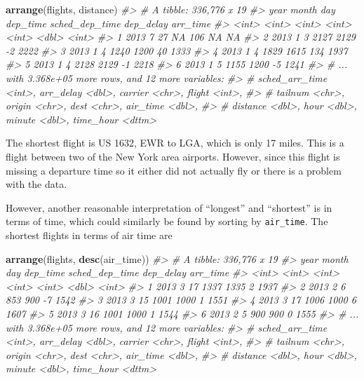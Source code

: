 \documentclass[]{book}
\newenvironment{Shaded}{\begin{snugshade}}{\end{snugshade}}
\newcommand{\CommentTok}[1]{\textcolor[rgb]{0.56,0.35,0.01}{\textit{#1}}}
\newcommand{\KeywordTok}[1]{\textcolor[rgb]{0.13,0.29,0.53}{\textbf{#1}}}
\newcommand{\NormalTok}[1]{#1}
\theoremstyle{plain}
\theoremstyle{remark}
\begin{document}
\begin{Shaded}
\begin{Highlighting}[]
\KeywordTok{arrange}\NormalTok{(flights, distance)}
\CommentTok{#> # A tibble: 336,776 x 19}
\CommentTok{#>    year month   day dep_time sched_dep_time dep_delay arr_time}
\CommentTok{#>   <int> <int> <int>    <int>          <int>     <dbl>    <int>}
\CommentTok{#> 1  2013     7    27       NA            106        NA       NA}
\CommentTok{#> 2  2013     1     3     2127           2129        -2     2222}
\CommentTok{#> 3  2013     1     4     1240           1200        40     1333}
\CommentTok{#> 4  2013     1     4     1829           1615       134     1937}
\CommentTok{#> 5  2013     1     4     2128           2129        -1     2218}
\CommentTok{#> 6  2013     1     5     1155           1200        -5     1241}
\CommentTok{#> # ... with 3.368e+05 more rows, and 12 more variables:}
\CommentTok{#> #   sched_arr_time <int>, arr_delay <dbl>, carrier <chr>, flight <int>,}
\CommentTok{#> #   tailnum <chr>, origin <chr>, dest <chr>, air_time <dbl>,}
\CommentTok{#> #   distance <dbl>, hour <dbl>, minute <dbl>, time_hour <dttm>}
\end{Highlighting}
\end{Shaded}

The shortest flight is US 1632, EWR to LGA, which is only 17 miles.
This is a flight between two of the New York area airports.
However, since this flight is missing a departure time so it either did not actually fly or there is a problem with the data.

However, another reasonable interpretation of ``longest'' and ``shortest'' is in terms of
time, which could similarly be found by sorting by \texttt{air\_time}.
The shortest flights in terms of air time are

\begin{Shaded}
\begin{Highlighting}[]
\KeywordTok{arrange}\NormalTok{(flights, }\KeywordTok{desc}\NormalTok{(air_time))}
\CommentTok{#> # A tibble: 336,776 x 19}
\CommentTok{#>    year month   day dep_time sched_dep_time dep_delay arr_time}
\CommentTok{#>   <int> <int> <int>    <int>          <int>     <dbl>    <int>}
\CommentTok{#> 1  2013     3    17     1337           1335         2     1937}
\CommentTok{#> 2  2013     2     6      853            900        -7     1542}
\CommentTok{#> 3  2013     3    15     1001           1000         1     1551}
\CommentTok{#> 4  2013     3    17     1006           1000         6     1607}
\CommentTok{#> 5  2013     3    16     1001           1000         1     1544}
\CommentTok{#> 6  2013     2     5      900            900         0     1555}
\CommentTok{#> # ... with 3.368e+05 more rows, and 12 more variables:}
\CommentTok{#> #   sched_arr_time <int>, arr_delay <dbl>, carrier <chr>, flight <int>,}
\CommentTok{#> #   tailnum <chr>, origin <chr>, dest <chr>, air_time <dbl>,}
\CommentTok{#> #   distance <dbl>, hour <dbl>, minute <dbl>, time_hour <dttm>}
\end{Highlighting}
\end{Shaded}
\end{document}
